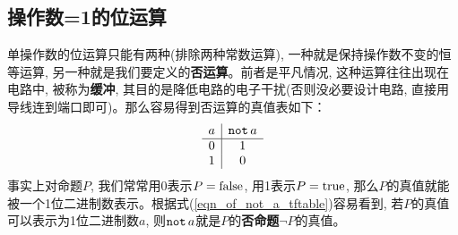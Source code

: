 \subsection*{操作数=1的位运算}
\par 单操作数的位运算只能有两种(排除两种常数运算), 一种就是保持操作数不变的恒等运算, 另一种就是我们要定义的\textbf{否运算}。前者是平凡情况, 这种运算往往出现在电路中, 被称为\textbf{缓冲}, 其目的是降低电路的电子干扰(否则没必要设计电路, 直接用导线连到端口即可)。那么容易得到否运算的真值表如下：
\begin{equation}\label{eqn_of_not_a_tftable}
    \begin{array}{c|c}
        a&\operatorname{\texttt{not}} a\\
        \hline
        0&1\\
        1&0\\
    \end{array}
\end{equation}
事实上对命题$P$, 我们常常用0表示$P=\rm false$, 用1表示$P=\rm true$, 那么$P$的真值就能被一个1位二进制数表示。根据式(\ref{eqn_of_not_a_tftable})容易看到, 若$P$的真值可以表示为1位二进制数$a$, 则$\operatorname{\texttt{not}} a$就是$P$的\textbf{否命题}$\lnot P$的真值。
